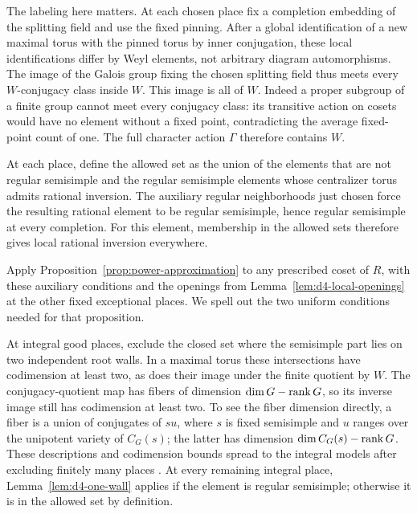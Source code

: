 The labeling here matters.  At each chosen place fix a completion
embedding of the splitting field and use the fixed pinning.  After a
global identification of a new maximal torus with the pinned torus by
inner conjugation, these local identifications differ by Weyl elements,
not arbitrary diagram automorphisms.  The image of the Galois group
fixing the chosen splitting field thus meets every $W$-conjugacy class
inside $W$.  This image is all of $W$.  Indeed a proper subgroup of a
finite group cannot meet every conjugacy class: its transitive action on
cosets would have no element without a fixed point, contradicting the
average fixed-point count of one.  The full character action $\Gamma$
therefore contains $W$.

At each place, define the allowed set as the union of the elements that
are not regular semisimple and the regular semisimple elements
whose centralizer torus admits rational inversion. The auxiliary
regular neighborhoods just chosen force the resulting rational element
to be regular semisimple, hence regular semisimple at every completion.
For this element, membership in the allowed sets therefore gives
local rational inversion everywhere.

Apply Proposition~\ref{prop:power-approximation} to any prescribed coset
of $R$, with these auxiliary conditions and the openings from
Lemma~\ref{lem:d4-local-openings} at the other fixed exceptional places.
We spell out the two uniform conditions needed for that proposition.

At integral good places, exclude the closed set where the semisimple
part lies on two independent root walls.  In a maximal torus these
intersections have codimension at least two, as does their image under
the finite quotient by $W$.  The conjugacy-quotient map has fibers of
dimension $\dim G-\operatorname{rank} G$, so its inverse image still has codimension
at least two.  To see the fiber dimension directly, a fiber is a union
of conjugates of $su$, where $s$ is fixed semisimple and $u$ ranges over
the unipotent variety of $C_G(s)$; the latter has dimension
$\dim C_G(s)-\operatorname{rank} G$.  These descriptions and codimension bounds spread
to the integral models after excluding finitely many places
\cite[Theorem~6.11, p.~64]{SteinbergRegular1965}.
At every remaining integral place, Lemma~\ref{lem:d4-one-wall} applies
if the element is regular semisimple; otherwise it is in the allowed
set by definition.

